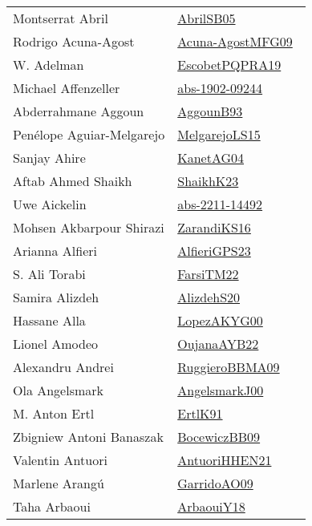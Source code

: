 {\begin{longtable}{p{4cm}p{20cm}}
Montserrat Abril & \href{works/AbrilSB05.pdf}{AbrilSB05}~\cite{AbrilSB05}\\
Rodrigo Acuna{-}Agost & \href{works/Acuna-AgostMFG09.pdf}{Acuna-AgostMFG09}~\cite{Acuna-AgostMFG09}\\
W. Adelman & \href{works/EscobetPQPRA19.pdf}{EscobetPQPRA19}~\cite{EscobetPQPRA19}\\
Michael Affenzeller & \href{works/abs-1902-09244.pdf}{abs-1902-09244}~\cite{abs-1902-09244}\\
Abderrahmane Aggoun & \href{works/AggounB93.pdf}{AggounB93}~\cite{AggounB93}\\
Pen{\'{e}}lope Aguiar{-}Melgarejo & \href{works/MelgarejoLS15.pdf}{MelgarejoLS15}~\cite{MelgarejoLS15}\\
Sanjay Ahire & \href{}{KanetAG04}~\cite{KanetAG04}\\
Aftab Ahmed Shaikh & \href{works/ShaikhK23.pdf}{ShaikhK23}~\cite{ShaikhK23}\\
Uwe Aickelin & \href{works/abs-2211-14492.pdf}{abs-2211-14492}~\cite{abs-2211-14492}\\
Mohsen Akbarpour Shirazi & \href{works/ZarandiKS16.pdf}{ZarandiKS16}~\cite{ZarandiKS16}\\
Arianna Alfieri & \href{works/AlfieriGPS23.pdf}{AlfieriGPS23}~\cite{AlfieriGPS23}\\
S. Ali Torabi & \href{works/FarsiTM22.pdf}{FarsiTM22}~\cite{FarsiTM22}\\
Samira Alizdeh & \href{}{AlizdehS20}~\cite{AlizdehS20}\\
Hassane Alla & \href{works/LopezAKYG00.pdf}{LopezAKYG00}~\cite{LopezAKYG00}\\
Lionel Amodeo & \href{works/OujanaAYB22.pdf}{OujanaAYB22}~\cite{OujanaAYB22}\\
Alexandru Andrei & \href{works/RuggieroBBMA09.pdf}{RuggieroBBMA09}~\cite{RuggieroBBMA09}\\
Ola Angelsmark & \href{works/AngelsmarkJ00.pdf}{AngelsmarkJ00}~\cite{AngelsmarkJ00}\\
M. Anton Ertl & \href{works/ErtlK91.pdf}{ErtlK91}~\cite{ErtlK91}\\
Zbigniew Antoni Banaszak & \href{works/BocewiczBB09.pdf}{BocewiczBB09}~\cite{BocewiczBB09}\\
Valentin Antuori & \href{works/AntuoriHHEN21.pdf}{AntuoriHHEN21}~\cite{AntuoriHHEN21}\\
Marlene Arang{\'{u}} & \href{works/GarridoAO09.pdf}{GarridoAO09}~\cite{GarridoAO09}\\
Taha Arbaoui & \href{works/ArbaouiY18.pdf}{ArbaouiY18}~\cite{ArbaouiY18}\\

\end{longtable}}
